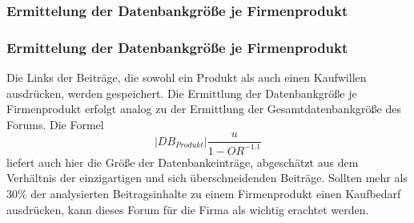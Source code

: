 \subsubsection{Ermittelung der Datenbankgröße je Firmenprodukt}
\subsubsection{Ermittelung der Datenbankgröße je Firmenprodukt}
Die Links der Beiträge, die sowohl ein Produkt als auch einen Kaufwillen ausdrücken, werden gespeichert. Die Ermittlung der Datenbankgröße je Firmenprodukt erfolgt analog zu der Ermittlung der Gesamtdatenbankgröße des Forums. Die Formel \[|DB_{Produkt}|\frac{u}{1-OR^{-1.1}}\] \cite{lu2008efficient} liefert auch hier die Größe der Datenbankeinträge, abgeschätzt aus dem Verhältnis der einzigartigen und sich überschneidenden Beiträge.
Sollten mehr als 30\% der analysierten Beitragsinhalte zu einem Firmenprodukt einen Kaufbedarf ausdrücken, kann dieses Forum für die Firma als wichtig erachtet werden.
